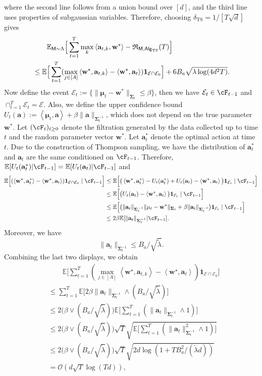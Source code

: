 \documentclass[10pt]{article}
\renewcommand{\cO}{\mathcal{O}}
\newcommand{\<}{\left\langle}
\renewcommand{\>}{\right\rangle}
\newcommand{\bone}{{\mathbf 1}}
\newcommand{\E}{\mathbb{E}}
\newcommand{\inst}{{\mathsf{M}}}
\newcommand{\TS}{{\mathrm{TS}}}
\newcommand{\Tpsmean}{{{\mathbf\mu}}}
\newcommand{\Tpscov}{{{\mathbf\Sigma}}}
\newcommand{\hpevent}{{\mathcal E}}
\newcommand{\totlen}{{T}}
\newcommand{\sAlg}{{\mathsf{Alg}}}
\newcommand{\prior}{{\Lambda}}
\newcommand{\totreward}{{\mathfrak{R}}}
\def\ba{{\mathbf a}}
\def\bw{{\mathbf w}}
\begin{document}
where the second line follows from a union bound over $[d]$, and the third line uses properties of subgaussian variables. Therefore, choosing ${\delta_{\TS}}=1/[T\sqrt{ d}]$  gives
\begin{align}
&\qquad\E_{\inst\sim\prior}\Big[\sum_{t=1}^\totlen\max_{k}\<\ba_{t,k},\bw^*\>-\totreward_{\inst,\sAlg_\TS}(\totlen)\Big]\notag\\
    &\leq
     \E\Big[\sum_{t=1}^T (\max_{j\in[A]}\<\bw^\star,\ba_{t,k}\>-\<\bw^\star,\ba_{t}\>) \bone_{\hpevent\cap\hpevent_0}\Big]+6B_a\sqrt{\lambda\log(4d^2T)}.\label{eq:ts_linear_regret_decomp}
\end{align}
Now define the event $\hpevent_t:=\{\|\Tpsmean_t-\bw^*\|_{\Tpscov_t}\leq\beta\}$,  then  we have $\hpevent_t\in\cF_{t-1}$  and $\cap_{t=1}^T \hpevent_t=\hpevent$. Also, we define the upper confidence bound $U_t(\ba):=\<\Tpsmean_t,\ba\>+\beta\|\ba\|_{\Tpscov_t^{-1}}$, which does not depend on the true parameter $\bw^*$. Let $(\cF_{t})_{t\geq 0}$ denote the filtration generated by the data collected up to time $t$ and the random parameter vector $\bw^*$.
Let $\ba_t^*$ denote the optimal action at time $t$. Due to the construction of Thompson sampling, we have the distribution of $\ba_t^*$ and $\ba_t$ are the same conditioned on $\cF_{t-1}$. Therefore, $\E[U_t(\ba_t^*)|\cF_{t-1}]=\E[U_t(\ba_t)|\cF_{t-1}]$ and
\begin{align*}
    \E\Big[ (\<\bw^\star,\ba_{t}^*\>-\<\bw^\star,\ba_{t}\>) \bone_{\hpevent\cap\hpevent_0}\mid\cF_{t-1}\Big]
   &\leq
\E\Big[ \big(\<\bw^\star,\ba_{t}^*\>-U_t(\ba_t^*)+U_t(\ba_t)-\<\bw^\star,\ba_{t}\>\big) \bone_{\hpevent_t}\mid\cF_{t-1}\Big]\\
    &\leq
  \E\Big[ \big(U_t(\ba_t)-\<\bw^\star,\ba_{t}\>\big) \bone_{\hpevent_t}\mid\cF_{t-1}\Big]\\
   &\leq
  \E\Big[ \big(\|\ba_t\|_{\Tpscov_t^{-1}}\|\Tpsmean_t-\bw^*\|_{\Tpscov_t} +\beta \|\ba_t\|_{\Tpscov_t^{-1}} \big)\bone_{\hpevent_t}\mid\cF_{t-1}\Big]\\
    &\leq
   2 \beta\E[\|\ba_t\|_{\Tpscov_t^{-1}}|\cF_{t-1}].
\end{align*}
Moreover, we have $$\|\ba_t\|_{\Tpscov_t^{-1}}\leq B_a/\sqrt{\tilde\lambda}.$$
Combining the last two displays, we obtain
\begin{align*}
     &\qquad\E\Big[\sum_{t=1}^T (\max_{j\in[A]}\<\bw^\star,\ba_{t,k}\>-\<\bw^\star,\ba_{t}\>) \bone_{\hpevent\cap\hpevent_0}\Big]\\
    &\leq\sum_{t=1}^T \E\Big[2 \beta \|\ba_t\|_{\Tpscov_t^{-1}}\wedge({B_a}/{\sqrt{\tilde\lambda}})\Big]\\
    &\leq
    2\big(\beta\vee ({B_a}/{\sqrt{\tilde\lambda}})\big)\E\Big[\sum_{t=1}^T (\|\ba_t\|_{\Tpscov_t^{-1}}\wedge1)\Big]\\
    &\leq
    2\big(\beta\vee ({B_a}/{\sqrt{\tilde\lambda}})\big)\sqrt{T}\sqrt{\E\Big[\sum_{t=1}^T (\|\ba_t\|^2_{\Tpscov_t^{-1}}\wedge1)\Big]}\\
    &\leq
    2\big(\beta\vee ({B_a}/{\sqrt{\tilde\lambda}})\big)\sqrt{T}\sqrt{2d\log(1+TB_a^2/(\tilde\lambda d))}\\
    &= \cO( d\sqrt{T}\log(Td)),
\end{align*}
\end{document}
